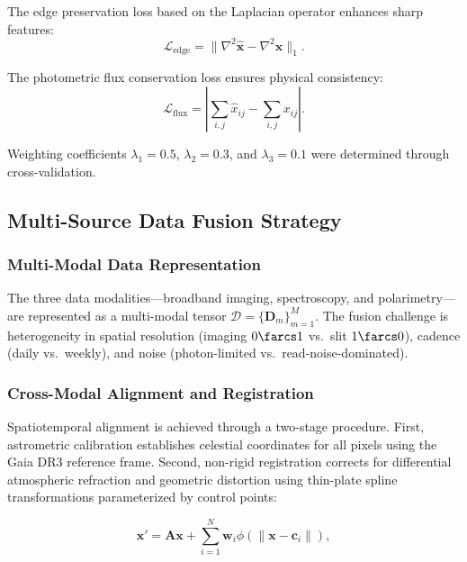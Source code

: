 \documentclass[preprint2]{aastex631}
\begin{document}
The edge preservation loss based on the Laplacian operator enhances sharp features:
\begin{equation}\label{eq:edge_loss}
\mathcal{L}_{\text{edge}} = \|\nabla^2 \hat{\mathbf{x}} - \nabla^2 \mathbf{x}\|_1.
\end{equation}

The photometric flux conservation loss ensures physical consistency:
\begin{equation}\label{eq:flux_loss}
\mathcal{L}_{\text{flux}} = \left| \sum_{i,j} \hat{x}_{ij} - \sum_{i,j} x_{ij} \right|.
\end{equation}

Weighting coefficients $\lambda_1 = 0.5$, $\lambda_2 = 0.3$, and $\lambda_3 = 0.1$ were determined through cross-validation.

\subsection{Multi-Source Data Fusion Strategy}

\subsubsection{Multi-Modal Data Representation}

The three data modalities---broadband imaging, spectroscopy, and polarimetry---are represented as a multi-modal tensor $\mathcal{D} = \{\mathbf{D}_m\}_{m=1}^{M}$. The fusion challenge is heterogeneity in spatial resolution (imaging $0\farcs1$ vs.\ slit $1\farcs0$), cadence (daily vs.\ weekly), and noise (photon-limited vs.\ read-noise-dominated).

\subsubsection{Cross-Modal Alignment and Registration}

Spatiotemporal alignment is achieved through a two-stage procedure. First, astrometric calibration establishes celestial coordinates for all pixels using the Gaia DR3 reference frame. Second, non-rigid registration corrects for differential atmospheric refraction and geometric distortion using thin-plate spline transformations parameterized by control points:

\begin{equation}\label{eq:tps}
\mathbf{x}' = \mathbf{A}\mathbf{x} + \sum_{i=1}^{N} \mathbf{w}_i \phi(\|\mathbf{x} - \mathbf{c}_i\|),
\end{equation}
\end{document}
